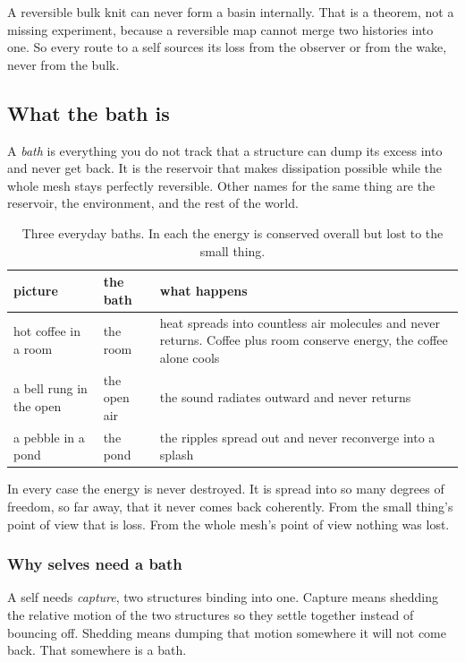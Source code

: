 A reversible bulk knit can never form a basin internally. That is a theorem, not a missing experiment, because a reversible map cannot merge two histories into one. So every route to a self sources its loss from the observer or from the wake, never from the bulk.

\subsection{What the bath is}

A \emph{bath} is everything you do not track that a structure can dump its excess into and never get back. It is the reservoir that makes dissipation possible while the whole mesh stays perfectly reversible. Other names for the same thing are the reservoir, the environment, and the rest of the world.

\begin{table}[ht]
\centering
\begin{tabular}{@{}p{}p{}p{}@{}}
\toprule
picture & the bath & what happens \\
\midrule
hot coffee in a room & the room & heat spreads into countless air molecules and never returns. Coffee plus room conserve energy, the coffee alone cools \\
a bell rung in the open & the open air & the sound radiates outward and never returns \\
a pebble in a pond & the pond & the ripples spread out and never reconverge into a splash \\
\bottomrule
\end{tabular}
\caption{Three everyday baths. In each the energy is conserved overall but lost to the small thing.}
\label{tab:bath-pictures}
\end{table}

In every case the energy is never destroyed. It is spread into so many degrees of freedom, so far away, that it never comes back coherently. From the small thing's point of view that is loss. From the whole mesh's point of view nothing was lost.

\subsubsection{Why selves need a bath}

A self needs \emph{capture}, two structures binding into one. Capture means shedding the relative motion of the two structures so they settle together instead of bouncing off. Shedding means dumping that motion somewhere it will not come back. That somewhere is a bath.

